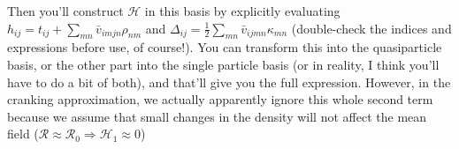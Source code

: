 \noindent Then you'll construct $\mathcal{H}$ in this basis by explicitly evaluating $h_{ij} = t_{ij} + \sum_{mn}\bar{v}_{imjn}\rho_{nm}$ and $\Delta_{ij} = \frac{1}{2}\sum_{mn}\bar{v}_{ijmn}\kappa_{mn}$ (double-check the indices and expressions before use, of course!). You can transform this into the quasiparticle basis, or the other part into the single particle basis (or in reality, I think you'll have to do a bit of both), and that'll give you the full expression. However, in the cranking approximation, we actually apparently ignore this whole second term because we assume that small changes in the density will not affect the mean field ($\mathcal{R}\approx\mathcal{R}_0 \Rightarrow\mathcal{H}_1\approx0$)